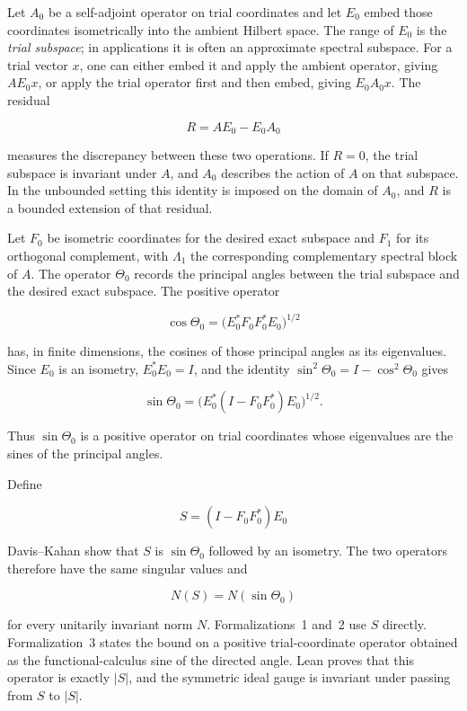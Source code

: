 \documentclass{article}
\begin{document}
Let $A_0$ be a self-adjoint operator on trial coordinates and let $E_0$ embed
those coordinates isometrically into the ambient Hilbert space. The range of
$E_0$ is the \emph{trial subspace}; in applications it is often an approximate
spectral subspace. For a trial vector $x$, one can either embed it and apply
the ambient operator, giving $AE_0x$, or apply the trial operator first and
then embed, giving $E_0A_0x$. The residual

\begin{equation}
  R=AE_0-E_0A_0
  \label{eq:residual}
\end{equation}

measures the discrepancy between these two operations. If $R=0$, the trial
subspace is invariant under $A$, and $A_0$ describes the action of $A$ on that
subspace. In the unbounded setting this identity is imposed on the domain of
$A_0$, and $R$ is a bounded extension of that residual.

Let $F_0$ be isometric coordinates for the desired exact subspace and $F_1$ for
its orthogonal complement, with $\Lambda_1$ the corresponding complementary
spectral block of $A$. The operator $\Theta_0$ records the principal angles
between the trial subspace and the desired exact subspace. The positive
operator

$$
  \cos\Theta_0
  = \bigl(E_0^*F_0F_0^*E_0\bigr)^{1/2}
$$

has, in finite dimensions, the cosines of those principal angles as its
eigenvalues. Since $E_0$ is an isometry, $E_0^*E_0=I$, and the identity
$\sin^2\Theta_0=I-\cos^2\Theta_0$ gives

$$
  \sin\Theta_0
  = \bigl(E_0^*(I-F_0F_0^*)E_0\bigr)^{1/2}.
$$

Thus $\sin\Theta_0$ is a positive operator on trial coordinates whose
eigenvalues are the sines of the principal angles.

Define

\begin{equation}
  S=(I-F_0F_0^*)E_0
  \label{eq:sin-theta-representative}
\end{equation}

Davis--Kahan show that $S$ is $\sin\Theta_0$ followed by an isometry. The two
operators therefore have the same singular values and

$$
  N(S)=N(\sin\Theta_0)
$$

for every unitarily invariant norm $N$. Formalizations~1 and~2 use $S$ directly.
Formalization~3 states the bound on a positive trial-coordinate operator obtained
as the functional-calculus sine of the directed angle.  Lean proves that this
operator is exactly $|S|$, and the symmetric ideal gauge is invariant under
passing from $S$ to $|S|$.
\end{document}

